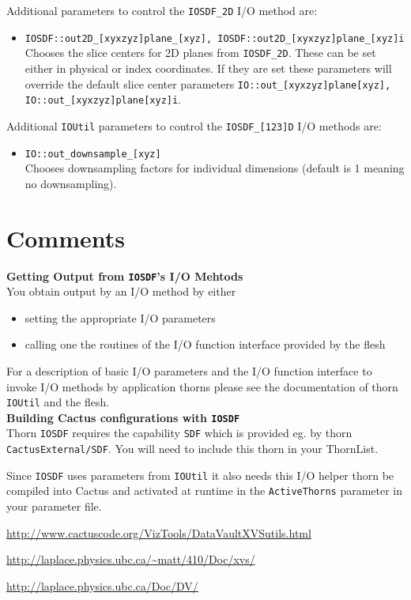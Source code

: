 \documentclass{article}
\begin{document}
%
Additional parameters to control the {\tt IOSDF\_2D} I/O method are:
\begin{itemize}
  \item {\tt IOSDF::out2D\_[{xy}{xz}{yz}]plane\_[xyz], IOSDF::out2D\_[{xy}{xz}{yz}]plane\_[xyz]i}\\
        Chooses the slice centers for 2D planes from {\tt IOSDF\_2D}. These
        can be set either in physical or index coordinates. If they are set
        these parameters will override the default slice center parameters
        {\tt IO::out\_[{xy}{xz}{yz}]plane[xyz], IO::out\_[{xy}{xz}{yz}]plane[xyz]i}.
\end{itemize}
%
Additional {\tt IOUtil} parameters to control the {\tt IOSDF\_[123]D} I/O methods are:
\begin{itemize}
  \item {\tt IO::out\_downsample\_[xyz]}\\
        Chooses downsampling factors for individual dimensions (default is 1
        meaning no downsampling).
\end{itemize}
%
%
\section{Comments}
%
{\bf Getting Output from {\tt IOSDF}'s I/O Mehtods}\\
%
You obtain output by an I/O method by either
%
\begin{itemize}
  \item setting the appropriate I/O parameters
  \item calling one the routines of the I/O function interface provided by the flesh
\end{itemize}
%
For a description of basic I/O parameters and the I/O function interface to
invoke I/O methods by application thorns please see the documentation of thorn
{\tt IOUtil} and the flesh.\\[3ex]
%
{\bf Building Cactus configurations with {\tt IOSDF}}\\
%
Thorn {\tt IOSDF} requires the capability {\tt SDF} which is provided eg.
by thorn {\tt CactusExternal/SDF}. You will need to include this thorn
in your ThornList.

Since {\tt IOSDF} uses parameters from {\tt IOUtil} it also needs this I/O
helper thorn be compiled into Cactus and activated at runtime in the
{\tt ActiveThorns} parameter in your parameter file.
%
%
\begin{thebibliography}{9}

\url{http://www.cactuscode.org/VizTools/DataVaultXVSutils.html}

\url{http://laplace.physics.ubc.ca/\~matt/410/Doc/xvs/}

\url{http://laplace.physics.ubc.ca/Doc/DV/}
\end{thebibliography}


\end{document}
